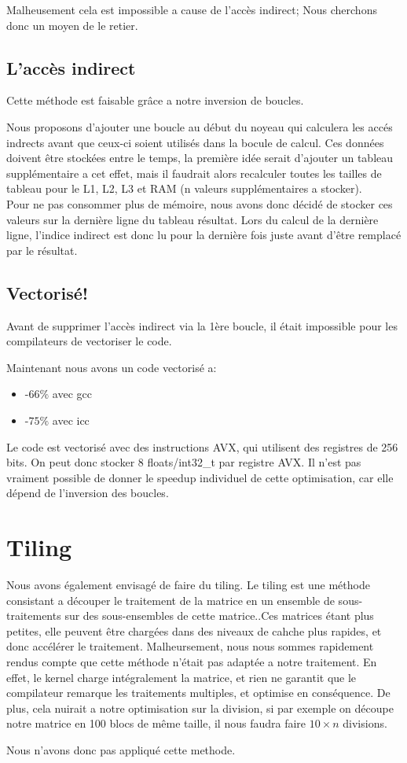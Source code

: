 Malheusement cela est impossible a cause de l'accès indirect; Nous cherchons donc un moyen de le retier.
\subsection*{L'accès indirect}
Cette méthode est faisable grâce a notre inversion de boucles.

Nous proposons d'ajouter une boucle au début du noyeau qui calculera les accés indrects avant que ceux-ci soient utilisés dans la bocule de calcul.
Ces données doivent être stockées entre le temps, la première idée serait d'ajouter un tableau supplémentaire a cet effet, mais il faudrait alors recalculer toutes les tailles de tableau pour le L1, L2, L3 et RAM (n valeurs supplémentaires a stocker).\\

Pour ne pas consommer plus de mémoire, nous avons donc décidé de stocker ces valeurs sur la dernière ligne du tableau résultat.
Lors du calcul de la dernière ligne, l'indice indirect est donc lu pour la dernière fois juste avant d'être remplacé par le résultat. 

\subsection*{Vectorisé!}
Avant de supprimer l'accès indirect via la 1ère boucle, il était impossible pour les compilateurs de vectoriser le code.

Maintenant nous avons un code vectorisé a:
    \begin{itemize}
    \item{-$66\%$ avec gcc}
    \item{-$75\%$ avec icc}
    \end{itemize}

    Le code est vectorisé avec des instructions AVX, qui utilisent des registres de 256 bits. On peut donc stocker 8 floats/int32\_t par registre AVX.
    Il n'est pas vraiment possible de donner le speedup individuel de cette optimisation, car elle dépend de l'inversion des boucles.

\section*{Tiling}
Nous avons également envisagé de faire du tiling. Le tiling est une méthode consistant a découper le traitement de la matrice en un ensemble de sous-traitements sur des sous-ensembles de cette matrice..Ces matrices étant plus petites, elle peuvent être chargées dans des niveaux de cahche plus rapides, et donc accélérer le traitement.
Malheursement, nous nous sommes rapidement rendus compte que cette méthode n'était pas adaptée a notre traitement.
En effet, le kernel charge intégralement la matrice, et rien ne garantit que le compilateur remarque les traitements multiples, et optimise en conséquence.
De plus, cela nuirait a notre optimisation sur la division, si par exemple on découpe notre matrice en 100 blocs de même taille, il nous faudra faire $10\times n $ divisions.

Nous n'avons donc pas appliqué cette methode.






